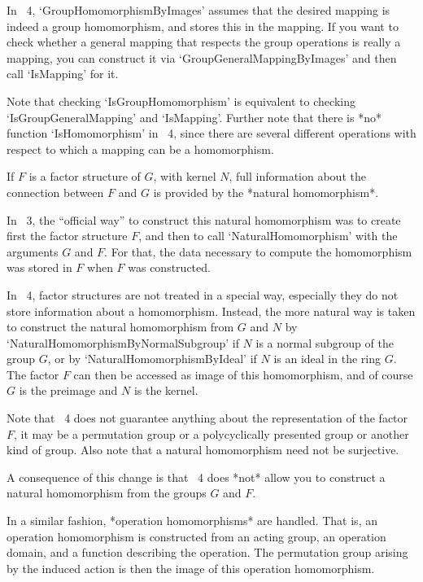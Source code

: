 In {\GAP}~4, `GroupHomomorphismByImages' assumes that the desired mapping
is indeed a group homomorphism, and stores this in the mapping.
If you want to check whether a general mapping that respects the group
operations is really a mapping, you can construct it via
`GroupGeneralMappingByImages' and then call `IsMapping' for it.

Note that checking `IsGroupHomomorphism' is equivalent to checking
`IsGroupGeneralMapping' and `IsMapping'.
Further note that there is *no* function `IsHomomorphism' in {\GAP}~4,
since there are several different operations with respect to which a
mapping can be a homomorphism.



If $F$ is a factor structure of $G$, with kernel $N$,
full information about the connection between $F$ and $G$ is provided by
the *natural homomorphism*.

In {\GAP}~3, the ``official way'' to construct this natural homomorphism
was to create first the factor structure $F$, and then to call
`NaturalHomomorphism' with the arguments $G$ and $F$.
For that, the data necessary to compute the homomorphism was stored in
$F$ when $F$ was constructed.

In {\GAP}~4, factor structures are not treated in a special way,
especially they do not store information about a homomorphism.
Instead, the more natural way is taken to construct the natural
homomorphism from $G$ and $N$ by `NaturalHomomorphismByNormalSubgroup'
if $N$ is a normal subgroup of the group $G$,
or by `NaturalHomomorphismByIdeal' if $N$ is an ideal in the ring $G$.
The factor $F$ can then be accessed as image of this homomorphism,
and of course $G$ is the preimage and $N$ is the kernel.

Note that {\GAP}~4 does not guarantee anything about the representation
of the factor $F$, it may be a permutation group or a polycyclically
presented group or another kind of group.
Also note that a natural homomorphism need not be surjective.

A consequence of this change is that {\GAP}~4 does *not* allow you to
construct a natural homomorphism from the groups $G$ and $F$.

In a similar fashion, *operation homomorphisms* are handled.
That is, an operation homomorphism is constructed from an acting group,
an operation domain, and a function describing the operation.
The permutation group arising by the induced action is then the image
of this operation homomorphism.

